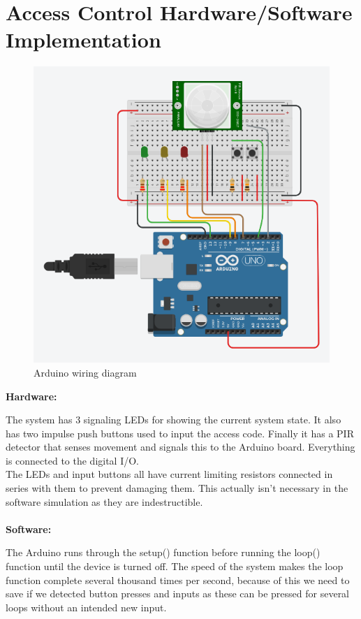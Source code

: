 \section{Access Control Hardware/Software Implementation}
\begin{figure}[H]
  \centering
  \includegraphics[scale=0.5]{figs/ArduinoSnapshot.png}
  \caption{Arduino wiring diagram}
  \label{fig:Arduino}
\end{figure}

\textbf{Hardware:}

The system has 3 signaling LEDs for showing the current system state. It also has two impulse push buttons used to input the access code. Finally it has a PIR detector that senses movement and signals this to the Arduino board. Everything is connected to the digital I/O.\\

The LEDs and input buttons all have current limiting resistors connected in series with them to prevent damaging them. This actually isn't necessary in the software simulation as they are indestructible. \\
\\
\textbf{Software:}

The Arduino runs through the setup() function before running the loop() function until the device is turned off. The speed of the system makes the loop function complete several thousand times per second, because of this we need to save if we detected button presses and inputs as these can be pressed for several loops without an intended new input.\\
 

